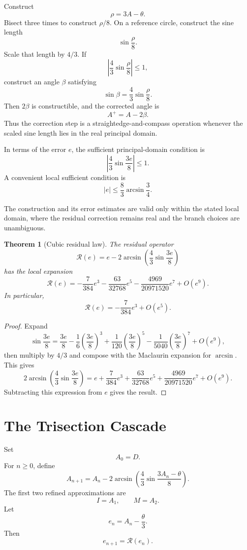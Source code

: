 \documentclass[11pt]{article}
\newtheorem{theorem}{Theorem}
\theoremstyle{remark}
\newcommand{\Rop}{\mathscr{R}}
\begin{document}
Construct
\[
\rho=3A-\theta.
\]
Bisect three times to construct $\rho/8$.  On a reference circle, construct the sine length
\[
\sin\frac{\rho}{8}.
\]
Scale that length by $4/3$.  If
\[
\left|\frac43\sin\frac{\rho}{8}\right|
\le 1,
\]
construct an angle $\beta$ satisfying
\[
\sin\beta
=
\frac43\sin\frac{\rho}{8}.
\]
Then $2\beta$ is constructible, and the corrected angle is
\[
A^+=A-2\beta.
\]
Thus the correction step is a straightedge-and-compass operation whenever the scaled sine
length lies in the real principal domain.

In terms of the error $e$, the sufficient principal-domain condition is
\[
\left|\frac43\sin\frac{3e}{8}\right|
\le 1.
\]
A convenient local sufficient condition is
\[
|e|
\le
\frac83\arcsin\frac34.
\]

The construction and its error estimates are valid only within the stated local domain, where the residual correction remains real and the branch choices are unambiguous.

\begin{theorem}[Cubic residual law]\label{thm:residual}
The residual operator
\[
\Rop(e)
=
e
-
2\arcsin\!\left(
\frac43\sin\frac{3e}{8}
\right)
\]
has the local expansion
\[
\Rop(e)
=
-\frac{7}{384}e^3
-
\frac{63}{32768}e^5
-
\frac{4969}{20971520}e^7
+
O(e^9).
\]
In particular,
\[
\Rop(e)
=
-\frac{7}{384}e^3+O(e^5).
\]
\end{theorem}

\begin{proof}
Expand
\[
\sin\frac{3e}{8}
=
\frac{3e}{8}
-
\frac{1}{6}\left(\frac{3e}{8}\right)^3
+
\frac{1}{120}\left(\frac{3e}{8}\right)^5
-
\frac{1}{5040}\left(\frac{3e}{8}\right)^7
+
O(e^9),
\]
then multiply by $4/3$ and compose with the Maclaurin expansion for $\arcsin$.
This gives
\[
2\arcsin\!\left(
\frac43\sin\frac{3e}{8}
\right)
=
e
+
\frac{7}{384}e^3
+
\frac{63}{32768}e^5
+
\frac{4969}{20971520}e^7
+
O(e^9).
\]
Subtracting this expression from $e$ gives the result.
\end{proof}

\section{The Trisection Cascade}

Set
\[
A_0=D.
\]
For $n\ge 0$, define
\[
A_{n+1}
=
A_n
-
2\arcsin\!\left(
\frac43\sin\frac{3A_n-\theta}{8}
\right).
\]
The first two refined approximations are
\[
I=A_1,
\qquad
M=A_2.
\]
Let
\[
e_n=A_n-\frac{\theta}{3}.
\]
Then
\[
e_{n+1}=\Rop(e_n).
\]
\end{document}
